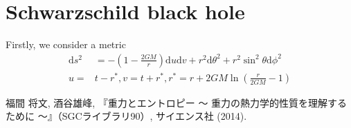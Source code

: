 \documentclass[10pt,onecolumn,dvipdfmx]{jsarticle}
\begin{document}
\title{}
\author{Kazuma Oka}
\date{}
\maketitle

\section{Schwarzschild black hole}
Firstly, we consider a metric
\begin{align}
\mathrm{d} s^2 &=-\left( 1-\frac{2GM}{r} \right) \mathrm{d} u\mathrm{d} v+r^2 \mathrm{d} \theta ^2 +r^2 \sin^2 {\theta } \mathrm{d} \phi ^2 \\
u=&t-r^*, v=t+r^*, r^*=r+2GM\ln{\left( \frac{r}{2GM} -1\right) }
\end{align}


\begin{thebibliography}{9}
 福間 将文, 酒谷雄峰, 『重力とエントロピー 〜 重力の熱力学的性質を理解するために 〜』（SGCライブラリ90）, サイエンス社 (2014).
\end{thebibliography}
\end{document}
